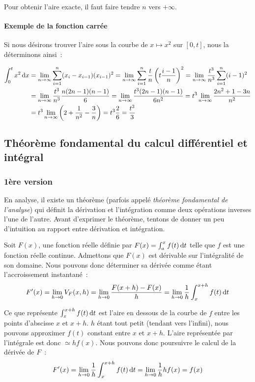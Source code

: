 \documentclass{article}
\theoremstyle{definition}
\theoremstyle{remark}
\begin{document}
			Pour obtenir l'aire exacte, il faut faire tendre $n$ vers $+\infty$.

			\paragraph{Exemple de la fonction carrée}
				Si nous désirons trouver l'aire sous la courbe de $x \mapsto x^2$ sur $[0, t]$, nous la déterminons ainsi~:

				\[\begin{aligned}
					\int_0^tx^2\dif x &= \lim_{n \to \infty}\sum_{i=1}^n(x_i-x_{i-1})(x_{i-1})^2 = \lim_{n \to \infty}\sum_{i=1}^n\frac tn\left(t\frac {i-1}{n}\right)^2 =
					\lim_{n \to \infty}\frac {t^3}{n^3}\sum_{i=1}^n(i-1)^2 \\
									  &= \lim_{n \to \infty}\frac {t^3}{n^3}\frac {n(2n-1)(n-1)}{6} = \lim_{n \to \infty}\frac {t^3(2n-1)(n-1)}{6n^2} =
					t^3\lim_{n \to \infty}\frac {2n^2 + 1 - 3n}{n^2} \\
									  &= t^3\lim_{n \to \infty}\left(2 + \frac {1}{n^2} - \frac 3n\right) = t^3\frac 26 = \frac {t^3}{3}
				\end{aligned}\]

	\subsection{Théorème fondamental du calcul différentiel et intégral}
		\subsubsection{1ère version}
				En analyse, il existe un théorème (parfois appelé \textit{théorème fondamental de l'analyse}) qui définit la dérivation et l'intégration
				comme deux opérations inverses l'une de l'autre. Avant d'exprimer le théorème, tentons de donner un peu d'intuition au rapport
				entre dérivation et intégration.

				Soit $F(x)$, une fonction réelle définie par $F(x) = \int_a^xf(t)\dif t$ telle que $f$ est une fonction réelle continue. Admettons que
				$F(x)$ est dérivable sur l'intégralité de son domaine. Nous pouvons donc déterminer sa dérivée comme étant l'accroissement instantané~:
				\[F'(x) = \lim_{h \to 0}V_F(x, h) = \lim_{h \to 0}\frac {F(x+h) - F(x)}{h} = \lim_{h \to 0} \frac 1h\int_x^{x+h}f(t)\dif t\]

				Ce que représente $\int_x^{x+h}f(t)\dif t$ est l'aire en dessous de la courbe de $f$ entre les points d'abscisse $x$ et $x+h$.
				$h$ étant tout petit (tendant vers l'infini), nous pouvons approximer $f(t)$ constant entre $x$ et $x+h$. L'aire représentée par
				l'intégrale est donc $\simeq hf(x)$. Nous pouvons donc poursuivre le calcul de la dérivée de $F$~:
				\[F'(x) = \lim_{h \to 0} \frac 1h\int_x^{x+h}f(t)\dif t = \lim_{h \to 0} \frac 1hhf(x) = f(x)\]
\end{document}
